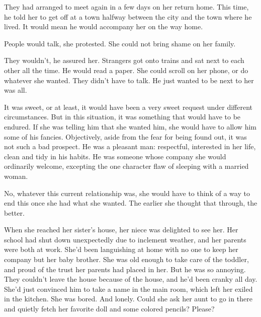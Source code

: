 \documentclass{article}
\newcommand{\egnote}{\todo[color=violet!30]}
\begin{document}
They had arranged to meet again in a few days on her return home. This time, he told her to get off at a town halfway between the city and the town where he lived. It would mean he would accompany her on the way home. 

People would talk, she protested. She could not bring shame on her family. 

They wouldn't, he assured her. Strangers got onto trains and sat next to each other all the time. He would read a paper. She could scroll on her phone, or do whatever she wanted. They didn't have to talk. He just wanted to be next to her was all.

It was sweet, or at least, it would have been a very sweet request under different circumstances. But in this situation, it was something that would have to be endured. If she was telling him that she wanted him, she would have to allow him some of his fancies. Objectively, aside from the fear for being found out, it was not such a bad prospect. He was a pleasant man: respectful, interested in her life, clean and tidy in his habits. He was someone whose company she would ordinarily welcome, excepting the one character flaw of sleeping with a married woman. 

No, whatever this current relationship was, she would have to think of a way to end this once she had what she wanted. The earlier she thought that through, the better.

When she reached her sister's house, her niece was delighted to see her. Her school had shut down unexpectedly due to inclement weather, and her parents were both at work. She'd been languishing at home with no one to keep her company but her baby brother. She was old enough to take care of the toddler, and proud of the trust her parents had placed in her. But he was so annoying. They couldn't leave the house because of the house\egnote{typo - heat?}, and he'd been cranky all day. She'd just convinced him to take a name\egnote{nap?} in the main room, which left her exiled in the kitchen. She was bored. And lonely. Could she ask her aunt to go in there and quietly fetch her favorite doll and some colored pencils? Please?
\end{document}
